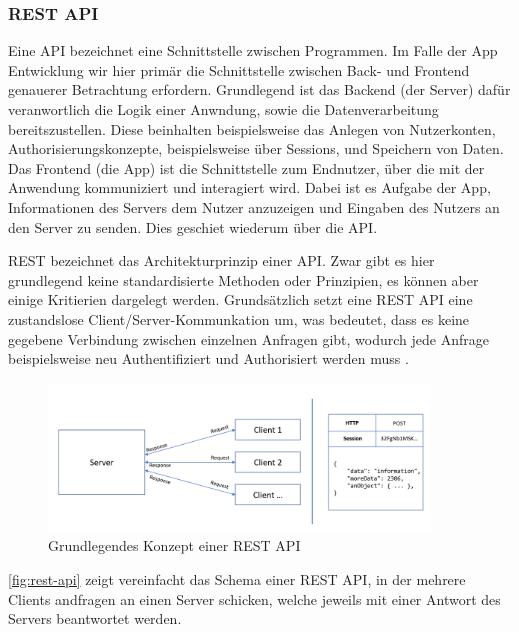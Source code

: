 \subsubsection*{\ac{REST} \ac{API}}
Eine \ac{API} bezeichnet eine Schnittstelle zwischen Programmen. 
Im Falle der App Entwicklung wir hier primär die Schnittstelle zwischen Back- und Frontend genauerer Betrachtung erfordern.
Grundlegend ist das Backend (der Server) dafür veranwortlich die Logik einer Anwndung, sowie die Datenverarbeitung bereitszustellen.
Diese beinhalten beispielsweise das Anlegen von Nutzerkonten, Authorisierungskonzepte, beispielsweise über Sessions, und Speichern von Daten.
Das Frontend (die App) ist die Schnittstelle zum Endnutzer, über die mit der Anwendung kommuniziert und interagiert wird.
Dabei ist es Aufgabe der App, Informationen des Servers dem Nutzer anzuzeigen und Eingaben des Nutzers an den Server zu senden. 
Dies geschiet wiederum über die \ac{API}.

\ac{REST} bezeichnet das Architekturprinzip einer API.
Zwar gibt es hier grundlegend keine standardisierte Methoden oder Prinzipien, es können aber einige Kritierien dargelegt werden.
Grundsätzlich setzt eine \ac{REST} \ac{API} eine zustandslose Client/Server-Kommunkation um, was bedeutet, dass es keine gegebene Verbindung zwischen einzelnen Anfragen gibt, wodurch jede Anfrage beispielsweise neu Authentifiziert und Authorisiert werden muss \autocite{B_RedHat.}.

\begin{figure}[h]
    \begin{center}
        \includegraphics[width=0.9\textwidth]{img/rest_api.PNG}
    \end{center}
    \caption{Grundlegendes Konzept einer REST API}
    \label{fig:rest-api}
\end{figure}

\autoref{fig:rest-api} zeigt vereinfacht das Schema einer \ac{REST} \ac{API}, in der mehrere Clients andfragen an einen Server schicken, welche jeweils mit einer Antwort des Servers beantwortet werden.

